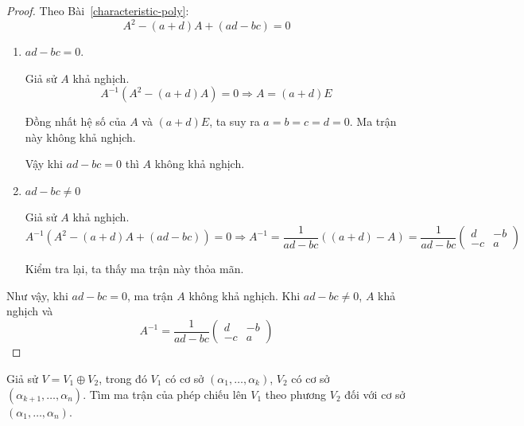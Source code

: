 \documentclass[class=linearalgebra,crop=false]{standalone}
\begin{document}
\begin{proof}
    Theo Bài~\ref{characteristic-poly}:
    \[
        A^{2} - (a+d)A + (ad-bc) = 0
    \]
    \begin{enumerate}[label = Trường hợp \arabic*:,itemindent=2cm]
        \item $ad - bc = 0$.
              \par Giả sử $A$ khả nghịch.
              \[
                  A^{-1}(A^{2} - (a+d)A) = 0 \Rightarrow A = (a+d)E
              \]
              \par Đồng nhất hệ số của $A$ và $(a+d)E$, ta suy ra $a = b = c =d = 0$. Ma trận này không khả nghịch.
              \par Vậy khi $ad - bc = 0$ thì $A$ không khả nghịch.
        \item $ad - bc \ne 0$
              \par Giả sử $A$ khả nghịch.
              \[
                  A^{-1}(A^{2} - (a+d)A + (ad-bc)) = 0 \Rightarrow A^{-1} = \frac{1}{ad-bc}((a+d) - A) = \frac{1}{ad-bc}\begin{pmatrix}d & -b \\ -c & a\end{pmatrix}
              \]
              \par Kiểm tra lại, ta thấy ma trận này thỏa mãn.
    \end{enumerate}
    \par Như vậy, khi $ad - bc = 0$, ma trận $A$ không khả nghịch. Khi $ad - bc \ne 0$, $A$ khả nghịch và
    \[
        A^{-1} = \frac{1}{ad-bc}\begin{pmatrix}d & -b \\ -c & a\end{pmatrix}
    \]
\end{proof}

\begin{exercise}
    Giả sử $V = V_{1}\oplus V_{2}$, trong đó $V_{1}$ có cơ sở $(\alpha_{1}, \ldots, \alpha_{k})$, $V_{2}$ có cơ sở $(\alpha_{k+1}, \ldots, \alpha_{n})$. Tìm ma trận của phép chiếu lên $V_{1}$ theo phương $V_{2}$ đối với cơ sở $(\alpha_{1}, \ldots, \alpha_{n})$.
\end{exercise}
\end{document}
